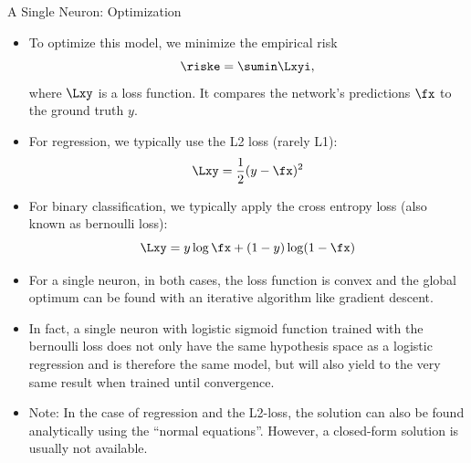 \begin{vbframe} {A Single Neuron: Optimization}
\begin{itemize}
\item To optimize this model, we minimize the empirical risk 
$$\riske = \sumin \Lxyi,$$
where $\Lxy$ is a loss function. It compares the network's predictions $\fx$ to the ground truth $y$. 
\item For regression, we typically use the L2 loss (rarely L1): $$\Lxy = \frac{1}{2}(y - \fx)^2$$
\item For binary classification, we typically apply the cross entropy loss (also known as bernoulli loss): $$\Lxy = y \log \fx + (1 - y) \log(1 - \fx)$$
\framebreak 

\vspace{.5cm}
\item For a single neuron, in both cases, the loss function is convex and the global optimum can be found with an iterative algorithm like gradient descent. 
\item In fact, a single neuron with logistic sigmoid function trained with the bernoulli loss does not only have the same hypothesis space as a logistic regression and is therefore the same model, but will also yield to the very same result when trained until convergence.
\item Note: In the case of regression and the L2-loss, the solution can
also be found analytically using the “normal equations”. However,
a closed-form solution is usually not available.
\end{itemize}
\end{vbframe} 

\endlecture

